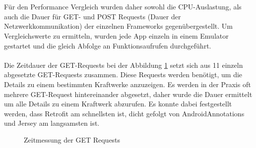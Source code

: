 \\\\
Für den Performance Vergleich wurden daher sowohl die CPU-Auslastung, als auch die Dauer für GET- und POST Requests (Dauer der Netzwerkkommunikation) der einzelnen Frameworks gegenübergestellt. Um Vergleichswerte zu ermitteln, wurden jede App einzeln in einem Emulator gestartet und die gleich Abfolge an Funktionsaufrufen durchgeführt. 
\\\\
Die Zeitdauer der GET-Requests bei der Abbildung \ref{getRequests} setzt sich aus 11 einzeln abgesetzte GET-Requests zusammen. Diese Requests werden benötigt, um die Details zu einem bestimmten Kraftwerke anzuzeigen. Es werden in der Praxis oft mehrere GET-Request hintereinander abgesetzt, daher wurde die Dauer ermittelt um alle Details zu einem Kraftwerk abzurufen. Es konnte dabei festgestellt werden, dass Retrofit am schnellsten ist, dicht gefolgt von AndroidAnnotations und Jersey am langsamsten ist.

\begin{figure} [ht]
	\centering
	 \qquad
	 \qquad
	 \qquad
	\caption{Zeitmessung der GET Requests} 
	\label{getRequests}
\end{figure} 

